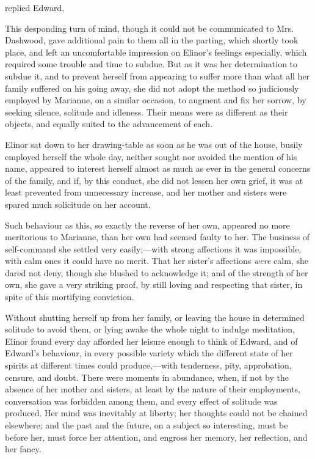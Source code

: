  replied Edward, 

This desponding turn of mind, though it could not be communicated to Mrs. Dashwood, gave additional pain to them all in the parting, which shortly took place, and left an uncomfortable impression on Elinor's feelings especially, which required some trouble and time to subdue. But as it was her determination to subdue it, and to prevent herself from appearing to suffer more than what all her family suffered on his going away, she did not adopt the method so judiciously employed by Marianne, on a similar occasion, to augment and fix her sorrow, by seeking silence, solitude and idleness. Their means were as different as their objects, and equally suited to the advancement of each.

Elinor sat down to her drawing-table as soon as he was out of the house, busily employed herself the whole day, neither sought nor avoided the mention of his name, appeared to interest herself almost as much as ever in the general concerns of the family, and if, by this conduct, she did not lessen her own grief, it was at least prevented from unnecessary increase, and her mother and sisters were spared much solicitude on her account.

Such behaviour as this, so exactly the reverse of her own, appeared no more meritorious to Marianne, than her own had seemed faulty to her. The business of self-command she settled very easily;---with strong affections it was impossible, with calm ones it could have no merit. That her sister's affections {\em were} calm, she dared not deny, though she blushed to acknowledge it; and of the strength of her own, she gave a very striking proof, by still loving and respecting that sister, in spite of this mortifying conviction.

Without shutting herself up from her family, or leaving the house in determined solitude to avoid them, or lying awake the whole night to indulge meditation, Elinor found every day afforded her leisure enough to think of Edward, and of Edward's behaviour, in every possible variety which the different state of her spirits at different times could produce,---with tenderness, pity, approbation, censure, and doubt. There were moments in abundance, when, if not by the absence of her mother and sisters, at least by the nature of their employments, conversation was forbidden among them, and every effect of solitude was produced. Her mind was inevitably at liberty; her thoughts could not be chained elsewhere; and the past and the future, on a subject so interesting, must be before her, must force her attention, and engross her memory, her reflection, and her fancy.


